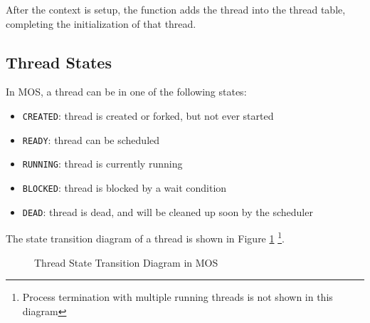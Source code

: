 After the context is setup, the function adds the thread into the thread table, completing
the initialization of that thread.

\subsection{Thread States}

In MOS, a thread can be in one of the following states:

\begin{itemize}
    \item \texttt{CREATED}: thread is created or forked, but not ever started
    \item \texttt{READY}: thread can be scheduled
    \item \texttt{RUNNING}: thread is currently running
    \item \texttt{BLOCKED}: thread is blocked by a wait condition
    \item \texttt{DEAD}: thread is dead, and will be cleaned up soon by the scheduler
\end{itemize}

The state transition diagram of a thread is shown in Figure \ref{fig:thread-state-transition}
\footnote{Process termination with multiple running threads is not shown in this diagram}.

\begin{figure}
    \centering
    \caption{Thread State Transition Diagram in MOS}
    \label{fig:thread-state-transition}
\end{figure}

